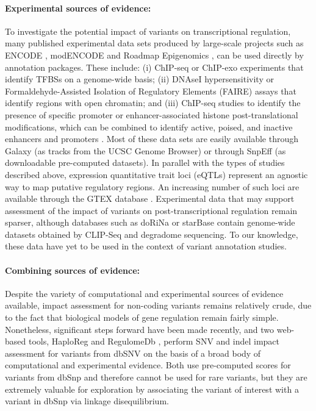 \paragraph{Experimental sources of evidence:} To investigate the potential impact of variants on transcriptional regulation, many published experimental data sets produced by large-scale projects such as ENCODE \cite{encode2012integrated}, modENCODE \cite{celniker2009unlocking} and Roadmap Epigenomics \cite{bernstein2010nih}, can be used directly by annotation packages. These include: (i) ChIP-seq or ChIP-exo experiments that identify TFBSs on a genome-wide basis; (ii) DNAseI hypersensitivity or Formaldehyde-Assisted Isolation of Regulatory Elements (FAIRE) assays that identify regions with open chromatin; and (iii) ChIP-seq studies to identify the presence of specific promoter or enhancer-associated histone post-translational modifications, which can be combined to identify active, poised, and inactive enhancers and promoters \cite{ray2013compendium}. Most of these data sets are easily available through Galaxy \cite{goecks2010galaxy} (as tracks from the UCSC Genome Browser) or through SnpEff (as downloadable pre-computed datasets). In parallel with the types of studies described above, expression quantitative trait loci (eQTLs) represent an agnostic way to map putative regulatory regions. An increasing number of such loci are available through the GTEX database  \cite{lonsdale2013genotype}. Experimental data that may support assessment of the impact of variants on post-transcriptional regulation remain sparser, although databases such as doRiNa  \cite{anders2011dorina} or starBase  \cite{yang2011starbase} contain genome-wide datasets obtained by CLIP-Seq and degradome sequencing. To our knowledge, these data have yet to be used in the context of variant annotation studies.

\paragraph{Combining sources of evidence:} Despite the variety of computational and experimental sources of evidence available, impact assessment for non-coding variants remains relatively crude, due to the fact that biological models of gene regulation remain fairly simple. Nonetheless, significant steps forward have been made recently, and two web-based tools, HaploReg  \cite{ward2012haploreg} and RegulomeDb  \cite{boyle2012annotation}, perform SNV and indel impact assessment for variants from dbSNV on the basis of a broad body of computational and experimental evidence. Both use pre-computed scores for variants from dbSnp and therefore cannot be used for rare variants, but they are extremely valuable for exploration by associating the variant of interest with a variant in dbSnp via linkage disequilibrium. 

